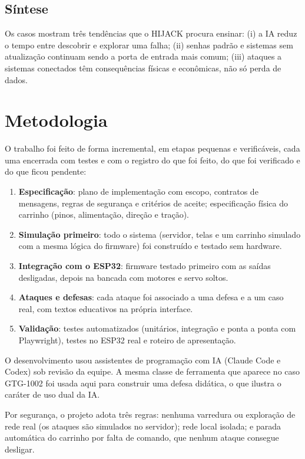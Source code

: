 \documentclass[12pt,openright,oneside,a4paper,english,brazil]{abntex2}
\begin{document}
\section{Síntese}

Os casos mostram três tendências que o HIJACK procura ensinar: (i) a IA reduz o tempo entre descobrir e explorar uma falha; (ii) senhas padrão e sistemas sem atualização continuam sendo a porta de entrada mais comum; (iii) ataques a sistemas conectados têm consequências físicas e econômicas, não só perda de dados.

\chapter{Metodologia}

O trabalho foi feito de forma incremental, em etapas pequenas e verificáveis, cada uma encerrada com testes e com o registro do que foi feito, do que foi verificado e do que ficou pendente:

\begin{enumerate}
  \item \textbf{Especificação}: plano de implementação com escopo, contratos de mensagens, regras de segurança e critérios de aceite; especificação física do carrinho (pinos, alimentação, direção e tração).
  \item \textbf{Simulação primeiro}: todo o sistema (servidor, telas e um carrinho simulado com a mesma lógica do firmware) foi construído e testado sem hardware.
  \item \textbf{Integração com o ESP32}: firmware testado primeiro com as saídas desligadas, depois na bancada com motores e servo soltos.
  \item \textbf{Ataques e defesas}: cada ataque foi associado a uma defesa e a um caso real, com textos educativos na própria interface.
  \item \textbf{Validação}: testes automatizados (unitários, integração e ponta a ponta com Playwright), testes no ESP32 real e roteiro de apresentação.
\end{enumerate}

O desenvolvimento usou assistentes de programação com IA (Claude Code e Codex) sob revisão da equipe. A mesma classe de ferramenta que aparece no caso GTG-1002 foi usada aqui para construir uma defesa didática, o que ilustra o caráter de uso dual da IA.

Por segurança, o projeto adota três regras: nenhuma varredura ou exploração de rede real (os ataques são simulados no servidor); rede local isolada; e parada automática do carrinho por falta de comando, que nenhum ataque consegue desligar.
\end{document}
